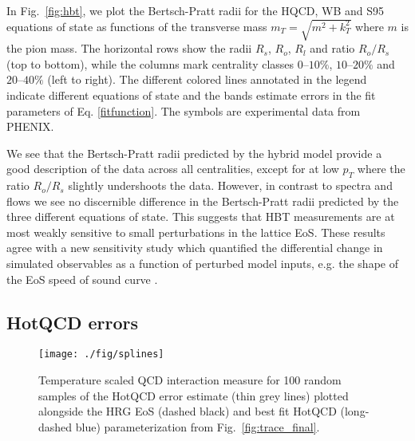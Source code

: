 \documentclass[aps,prc,reprint,amsmath,nofootinbib,superscriptaddress]{revtex4-1}
\begin{document}
In Fig.~\ref{fig:hbt}, we plot the Bertsch-Pratt radii for the HQCD, WB and S95 equations of state as functions of the transverse mass $m_T = \sqrt{m^2 + k_T^2}$ where $m$ is the pion mass. The horizontal rows show the radii $R_s$, $R_o$, $R_l$ and ratio $R_o/R_s$ (top to bottom), while the columns mark centrality classes $0$--$10\%$, $10$--$20\%$ and $20$--$40\%$ (left to right). The different colored lines annotated in the legend indicate different equations of state and the bands estimate errors in the fit parameters of Eq. \eqref{fitfunction}. The symbols are experimental data from PHENIX.

We see that the Bertsch-Pratt radii predicted by the hybrid model provide a good description of the data across all centralities, except for at low $p_T$ where the ratio $R_o/R_s$ slightly undershoots the data. However, in contrast to spectra and flows we see no discernible difference in the Bertsch-Pratt radii predicted by the three different equations of state. This suggests
that HBT measurements are at most weakly sensitive to small perturbations in the lattice EoS. These results agree with a new sensitivity study which quantified the differential change in simulated observables as a function of perturbed model inputs, e.g. the shape of the EoS speed of sound curve \cite{Sangaline:2015isa}. 

\subsection{HotQCD errors}
\label{errors}

\begin{figure}[t]
  \texttt{[image: ./fig/splines]}
  \caption{
    \label{fig:splines}
    Temperature scaled QCD interaction measure for 100 random samples of the HotQCD error estimate (thin grey lines) plotted alongside the HRG EoS (dashed black) and 
    best fit HotQCD (long-dashed blue) parameterization from Fig.~\ref{fig:trace_final}.
  }
\end{figure}
\end{document}
